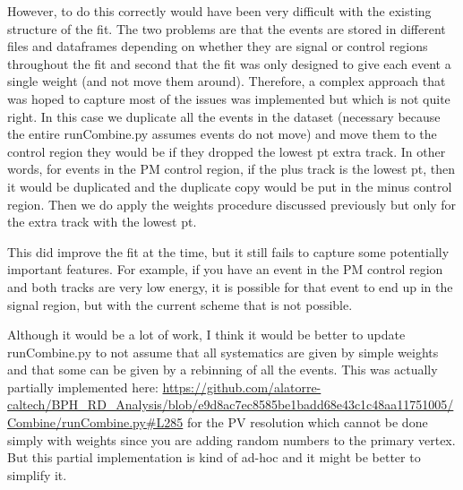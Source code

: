 \documentclass[12pt]{report}
\begin{document}
However, to do this correctly would have been very difficult with the existing
structure of the fit. The two problems are that the events are stored in
different files and dataframes depending on whether they are signal or control
regions throughout the fit and second that the fit was only designed to give
each event a single weight (and not move them around). Therefore, a complex
approach that was hoped to capture most of the issues was implemented but which
is not quite right. In this case we duplicate all the events in the dataset
(necessary because the entire runCombine.py assumes events do not move) and
move them to the control region they would be if they dropped the lowest pt
extra track. In other words, for events in the PM control region, if the plus
track is the lowest pt, then it would be duplicated and the duplicate copy
would be put in the minus control region. Then we do apply the weights
procedure discussed previously but only for the extra track with the lowest pt.

This did improve the fit at the time, but it still fails to capture some
potentially important features. For example, if you have an event in the PM
control region and both tracks are very low energy, it is possible for that
event to end up in the signal region, but with the current scheme that is not
possible.

Although it would be a lot of work, I think it would be better to update
runCombine.py to not assume that all systematics are given by simple weights
and that some can be given by a rebinning of all the events. This was actually
partially implemented here:
\url{https://github.com/alatorre-caltech/BPH_RD_Analysis/blob/e9d8ac7ec8585be1badd68e43c1c48aa11751005/Combine/runCombine.py#L285}
for the PV resolution which cannot be done simply with weights since you are
adding random numbers to the primary vertex. But this partial implementation is
kind of ad-hoc and it might be better to simplify it.
\end{document}
